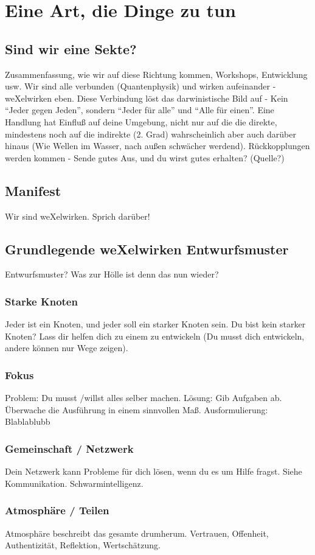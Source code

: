 \chapter{Eine Art, die Dinge zu tun}
  \section{Sind wir eine Sekte?}
Zusammenfassung, wie wir auf diese Richtung kommen, Workshops, Entwicklung usw.
%
Wir sind alle verbunden (Quantenphysik) und wirken aufeinander - weXelwirken eben.
%
Diese Verbindung löst das darwinistische Bild auf - Kein "`Jeder gegen Jeden"', sondern "`Jeder für alle"' und "`Alle für einen"'.
%
Eine Handlung hat Einfluß auf deine Umgebung, nicht nur auf die die direkte, mindestens noch auf die indirekte (2. Grad) wahrscheinlich aber auch darüber hinaus (Wie Wellen im Wasser, nach außen schwächer werdend).
%
Rückkopplungen werden kommen - Sende gutes Aus, und du wirst gutes erhalten? (Quelle?)
  \section{Manifest}
Wir sind weXelwirken. Sprich darüber!
  \section{Grundlegende weXelwirken Entwurfsmuster}
  Entwurfsmuster? Was zur Hölle ist denn das nun wieder?
    \subsection{Starke Knoten}
Jeder ist ein Knoten, und jeder soll ein starker Knoten sein.
%
Du bist kein starker Knoten?
%
Lass dir helfen dich zu einem zu entwickeln (Du musst dich entwickeln, andere können nur Wege zeigen).
    \subsection{Fokus}
Problem: Du musst /willst alles selber machen.
%
Lösung: Gib Aufgaben ab. Überwache die Ausführung in einem sinnvollen Maß.
%
Ausformulierung: Blablablubb
    \subsection{Gemeinschaft / Netzwerk}
Dein Netzwerk kann Probleme für dich lösen, wenn du es um Hilfe fragst.
%
Siehe Kommunikation. Schwarmintelligenz.
    \subsection{Atmosphäre / Teilen}
Atmosphäre beschreibt das gesamte drumherum.
%
Vertrauen, Offenheit, Authentizität, Reflektion, Wertschätzung.
